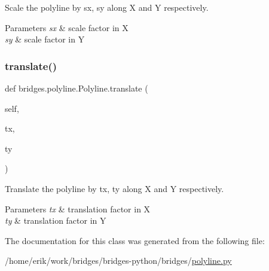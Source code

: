 Scale the polyline by sx, sy along X and Y respectively. 


\begin{DoxyParams}{Parameters}
{\em sx} & scale factor in X \\
\hline
{\em sy} & scale factor in Y \\
\hline
\end{DoxyParams}
\mbox{\label{classbridges_1_1polyline_1_1_polyline_a654226c0de86aa0c6b9b5181a552cbfe}} 
\subsubsection{\texorpdfstring{translate()}{translate()}}
{\footnotesize\ttfamily def bridges.\+polyline.\+Polyline.\+translate (\begin{DoxyParamCaption}\item[{}]{self,  }\item[{}]{tx,  }\item[{}]{ty }\end{DoxyParamCaption})}



Translate the polyline by tx, ty along X and Y respectively. 


\begin{DoxyParams}{Parameters}
{\em tx} & translation factor in X \\
\hline
{\em ty} & translation factor in Y \\
\hline
\end{DoxyParams}


The documentation for this class was generated from the following file\+:\begin{DoxyCompactItemize}
\item 
/home/erik/work/bridges/bridges-\/python/bridges/\hyperlink{polyline_8py}{polyline.\+py}\end{DoxyCompactItemize}
